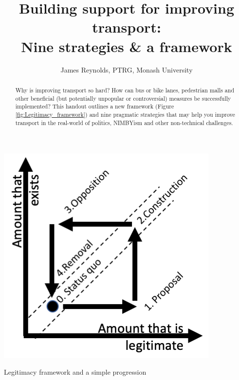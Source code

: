 \documentclass{tufte-handout}
\title{Building support for improving transport: \\ Nine strategies \& a framework}
\author{James Reynolds, PTRG, Monash University}
\begin{document}
\maketitle%


\begin{marginfigure}%
  \includegraphics[width=\linewidth]{Framework_and_progression}
  \caption{Legitimacy framework and a simple progression}
  \label{fig:Legitimacy_framework}
\end{marginfigure}
  


\begin{abstract}
\noindent
Why is improving transport so hard? How can bus or bike lanes, pedestrian malls and other beneficial (but potentially unpopular or controversial) measures be successfully implemented? This handout outlines a new framework (Figure \ref{fig:Legitimacy_framework}) and nine pragmatic strategies
that may help you improve transport in the real-world of politics, NIMBYism and other non-technical challenges.
\end{abstract}
\end{document}

